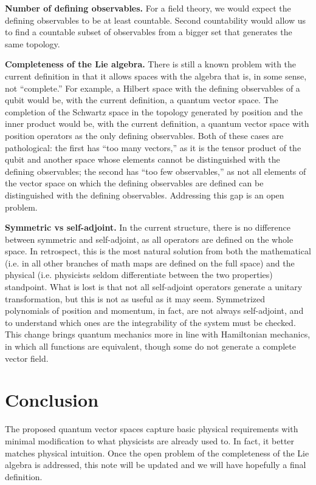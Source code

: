\documentclass{techbrief}
\begin{document}
\textbf{Number of defining observables.} For a field theory, we would expect the defining observables to be at least countable. Second countability would allow us to find a countable subset of observables from a bigger set that generates the same topology.

\textbf{Completeness of the Lie algebra.} There is still a known problem with the current definition in that it allows spaces with the algebra that is, in some sense, not ``complete.'' For example, a Hilbert space with the defining observables of a qubit would be, with the current definition, a quantum vector space. The completion of the Schwartz space in the topology generated by position and the inner product would be, with the current definition, a quantum vector space with position operators as the only defining observables. Both of these cases are pathological: the first has ``too many vectors,'' as it is the tensor product of the qubit and another space whose elements cannot be distinguished with the defining observables; the second has ``too few observables,'' as not all elements of the vector space on which the defining observables are defined can be distinguished with the defining observables. Addressing this gap is an open problem.

\textbf{Symmetric vs self-adjoint.} In the current structure, there is no difference between symmetric and self-adjoint, as all operators are defined on the whole space. In retrospect, this is the most natural solution from both the mathematical (i.e. in all other branches of math maps are defined on the full space) and the physical (i.e. physicists seldom differentiate between the two properties) standpoint. What is lost is that not all self-adjoint operators generate a unitary transformation, but this is not as useful as it may seem. Symmetrized polynomials of position and momentum, in fact, are not always self-adjoint, and to understand which ones are the integrability of the system must be checked. This change brings quantum mechanics more in line with Hamiltonian mechanics, in which all functions are equivalent, though some do not generate a complete vector field.

\section{Conclusion}

The proposed quantum vector spaces capture basic physical requirements with minimal modification to what physicists are already used to. In fact, it better matches physical intuition. Once the open problem of the completeness of the Lie algebra is addressed, this note will be updated and we will have hopefully a final definition.
\end{document}
